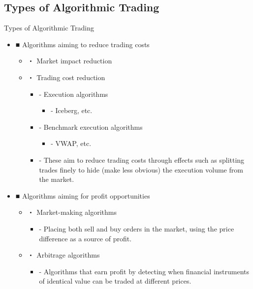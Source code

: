 \documentclass[dvipdfmx, autodetect-engine, aspectratio=169, 10.5pt]{beamer}
\begin{document}
\subsection{Types of Algorithmic Trading}
\begin{frame}{Types of Algorithmic Trading}
	\scriptsize
	\begin{itemize}
		\item ■ Algorithms aiming to reduce trading costs
		      \begin{itemize}
			      \item ・ Market impact reduction
			      \item ・ Trading cost reduction
			            \begin{itemize}
				            \item - Execution algorithms
				                  \begin{itemize}
					                  \item - Iceberg, etc.
				                  \end{itemize}
				            \item - Benchmark execution algorithms
				                  \begin{itemize}
					                  \item - VWAP, etc.
				                  \end{itemize}
				            \item - These aim to reduce trading costs through effects such as splitting trades finely to hide (make less obvious) the execution volume from the market.
			            \end{itemize}
		      \end{itemize}
		\item ■ Algorithms aiming for profit opportunities
		      \begin{itemize}
			      \item ・ Market-making algorithms
			            \begin{itemize}
				            \item - Placing both sell and buy orders in the market, using the price difference as a source of profit.
			            \end{itemize}
			      \item ・ Arbitrage algorithms
			            \begin{itemize}
				            \item - Algorithms that earn profit by detecting when financial instruments of identical value can be traded at different prices.

\end{itemize}
\end{itemize}
\end{itemize}
\end{frame}
\end{document}

